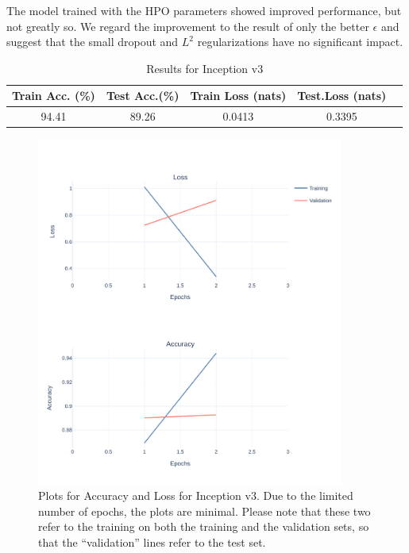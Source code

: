 The model trained with the HPO parameters showed improved performance, but not greatly so. We regard the improvement to the result of only the better $\epsilon$ and suggest that the small dropout and $L^2$ regularizations have no significant impact.
\begin{table}[H]
	\center
	\begin{tabular}{ |c|c|c|c|c| }
		\hline
		Train Acc. (\%) & Test Acc.(\%)  & Train Loss (nats) & Test.Loss (nats) \\
		\hline
		94.41 & 89.26 & 0.0413 & 0.3395\\
		\hline
	\end{tabular}
	\caption{Results for Inception v3}
	\label{table:inc3_res}
\end{table}
\begin{figure}[H]
	\centering
	\includegraphics[width=0.9\textwidth]{Inception v3 After HPO 2020-06-16 09_42_52.491141.pdf}
	\caption{Plots for Accuracy and Loss for Inception v3. Due to the limited number of epochs, the plots are minimal. Please note that these two refer to the training on both the training and the  validation sets, so that the ``validation'' lines refer to the test set.}
	\label{fig:inv3_results}
\end{figure}

